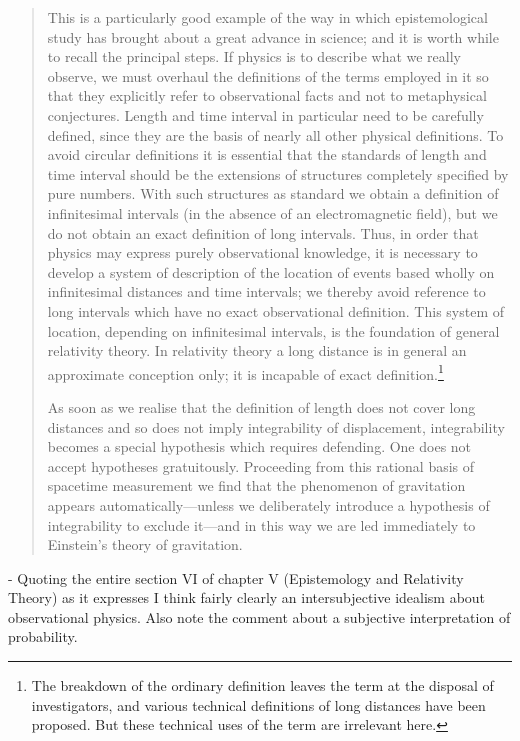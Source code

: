 \begin{quote}
    This is a particularly good example of the way in which epistemological study has brought about a great advance in science; and it is worth while to recall the principal steps.  If physics is to describe what we really observe, we must overhaul the definitions of the terms employed in it so that they explicitly refer to observational facts and not to metaphysical conjectures.  Length and time interval in particular need to be carefully defined, since they are the basis of nearly all other physical definitions.  To avoid circular definitions it is essential that the standards of length and time interval should be the extensions of structures completely specified by pure numbers.  With such structures as standard we obtain a definition of infinitesimal intervals (in the absence of an electromagnetic field), but we do not obtain an exact definition of long intervals.  Thus, in order that physics may express purely observational knowledge, it is necessary to develop a system of description of the location of events based wholly on infinitesimal distances and time intervals; we thereby avoid reference to long intervals which have no exact observational definition.  This system of location, depending on infinitesimal intervals, is the foundation of general relativity theory.  In relativity theory a long distance is in general an approximate conception only; it is incapable of exact definition.\footnote{The breakdown of the ordinary definition leaves the term at the disposal of investigators, and various technical definitions of long distances have been proposed.  But these technical uses of the term are irrelevant here.} 
    
    As soon as we realise that the definition of length does not cover long distances and so does not imply integrability of displacement, integrability becomes a special hypothesis which requires defending. One does not accept hypotheses gratuitously.  Proceeding from this rational basis of spacetime measurement we find that the phenomenon of gravitation appears automatically---unless we deliberately introduce a hypothesis of integrability to exclude it---and in this way we are led immediately to Einstein's theory of gravitation.\citep[p. 83-85]{Eddington1939}
\end{quote}

- Quoting the entire section VI of chapter V (Epistemology and Relativity Theory) as it expresses I think fairly clearly an intersubjective idealism about observational physics.  Also note the comment about a subjective interpretation of probability.


